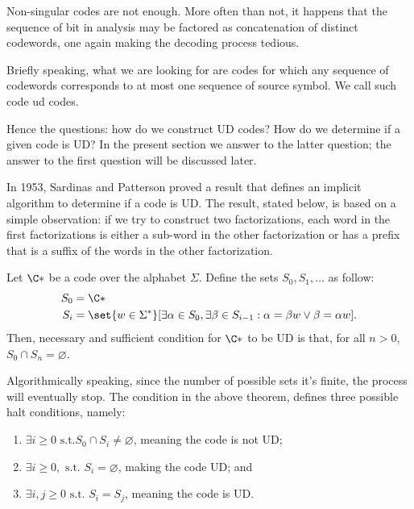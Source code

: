 \documentclass{subfiles}
\begin{document}
    Non-singular codes are not enough. 
        More often than not, it happens that the sequence of bit in analysis may be factored
        as concatenation of distinct codewords, one again making the decoding process tedious. 

    Briefly speaking, what we are looking for are codes for which any sequence of codewords
        corresponds to at most one sequence of source symbol.
        We call such code \gls{ud} codes.
        
    Hence the questions: how do we construct UD codes?
        How do we determine if a given code is UD? 
        In the present section we answer to the latter question;
        the answer to the first question will be discussed later.

    In 1953, Sardinas and Patterson proved a result that defines an implicit algorithm 
        to determine if a code is UD. The result, stated below, is based on a simple observation:
        if we try to construct two factorizations, each word in the first factorizations
        is either a sub-word in the other factorization or has a prefix that is a suffix of 
        the words in the other factorization.

    \begin{theorem*}
        Let \(\C*\) be a code over the alphabet \(\Sigma\).
        Define the sets \(S_{0}, S_{1}, \ldots\) as follow:
        \[\begin{aligned}
            S_{0} & = \C* \\ 
            S_{i} & = \set{w \in \Sigma^{*}}[\exists \alpha \in S_{0},
                \exists \beta \in S_{i - 1} : \alpha = \beta w \lor \beta = \alpha w].
        \end{aligned}\]
        Then, necessary and sufficient condition for \(\C*\) to be UD is that,
        for all \(n > 0\), \(S_{0} \cap S_{n} = \varnothing\).
    \end{theorem*}

    Algorithmically speaking, since the number of possible sets it's finite,
        the process will eventually stop. 
        The condition in the above theorem, defines three possible halt conditions,
        namely: 
        \begin{enumerate}
            \item \(\exists i \ge 0 \text{ s.t.} S_{0} \cap S_{i} \ne \varnothing\),
                meaning the code is not UD;
            \item \(\exists i \ge 0, \text{ s.t. } S_{i} = \varnothing\),
                making the code UD; and 
            \item \(\exists i, j \ge 0 \text{ s.t. } S_{i} = S_{j}\),
                meaning the code is UD.
        \end{enumerate}
\end{document}
